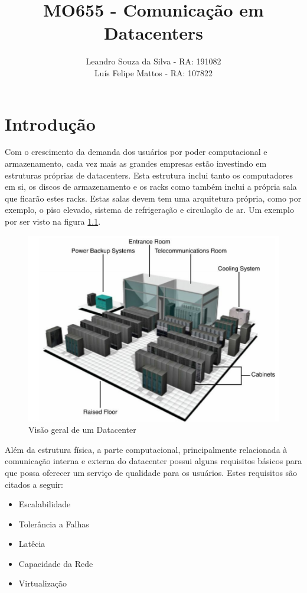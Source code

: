 \documentclass[12pt,a4paper]{report}
\author{Leandro Souza da  Silva - RA: 191082 \\ Luís Felipe Mattos - RA: 107822}
\title{MO655 - Comunicação em Datacenters}
\begin{document}
\maketitle

\tableofcontents

\chapter{Introdução}

Com o crescimento da demanda dos usuários por poder computacional e armazenamento, cada vez mais as grandes empresas estão investindo em estruturas próprias de datacenters. Esta estrutura inclui tanto os computadores em si, os discos de armazenamento e os racks como também inclui a própria sala que ficarão estes racks. Estas salas devem tem uma arquitetura própria, como por exemplo, o piso elevado, sistema de refrigeração e circulação de ar. Um exemplo por ser visto na figura \ref{dc_overview}.\\

\begin{figure}[H]
\centering
\includegraphics[width=.7\textwidth]{imagens/datacenter.png}
\caption{Visão geral de um Datacenter}
\label{dc_overview}
\end{figure}

Além da estrutura física, a parte computacional, principalmente relacionada à comunicação interna e externa do datacenter possui alguns requisitos básicos para que possa oferecer um serviço de qualidade para os usuários. Estes requisitos são citados a seguir:\\

\begin{itemize}
\item Escalabilidade
\item Tolerância a Falhas
\item Latêcia
\item Capacidade da Rede
\item Virtualização
\end{itemize}
\end{document}

